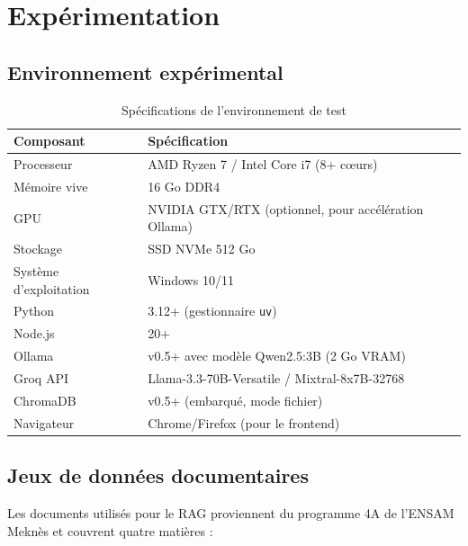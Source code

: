 \documentclass[12pt, a4paper]{article}
\begin{document}
\section{Expérimentation}
\label{chap:experimentation}

\subsection{Environnement expérimental}

\begin{table}[H]
\centering
\caption{Spécifications de l'environnement de test}
\label{tab:env_specs}
\small
\begin{tabularx}{\textwidth}{l X}
\toprule
\textbf{Composant} & \textbf{Spécification} \\
\midrule
Processeur & AMD Ryzen 7 / Intel Core i7 (8+ c\oe{}urs) \\
Mémoire vive & 16 Go DDR4 \\
GPU & NVIDIA GTX/RTX (optionnel, pour accélération Ollama) \\
Stockage & SSD NVMe 512 Go \\
Système d'exploitation & Windows 10/11 \\
\midrule
Python & 3.12+ (gestionnaire \texttt{uv}) \\
Node.js & 20+ \\
Ollama & v0.5+ avec modèle Qwen2.5:3B (2 Go VRAM) \\
Groq API & Llama-3.3-70B-Versatile / Mixtral-8x7B-32768 \\
ChromaDB & v0.5+ (embarqué, mode fichier) \\
Navigateur & Chrome/Firefox (pour le frontend) \\
\bottomrule
\end{tabularx}
\end{table}

\subsection{Jeux de données documentaires}

Les documents utilisés pour le RAG proviennent du programme 4A de l'ENSAM Meknès et couvrent quatre matières :
\end{document}
